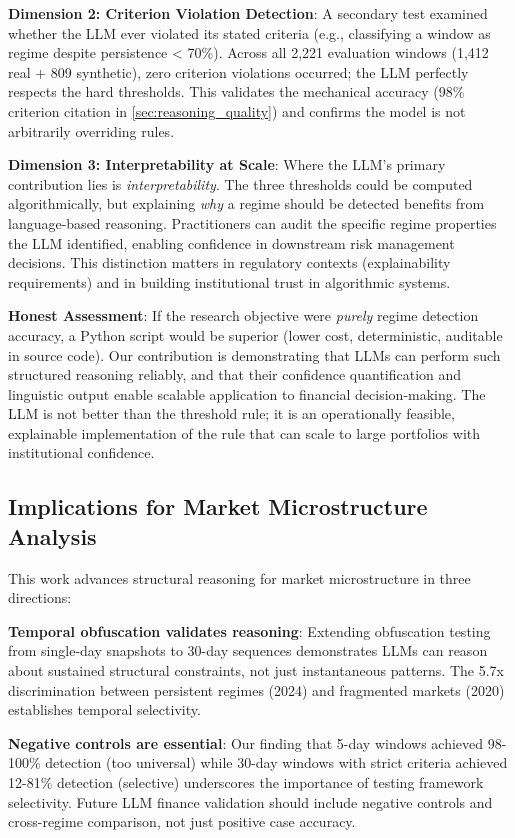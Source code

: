 \textbf{Dimension 2: Criterion Violation Detection}: A secondary test examined whether the LLM ever violated its stated criteria (e.g., classifying a window as regime despite persistence < 70\%). Across all 2,221 evaluation windows (1,412 real + 809 synthetic), zero criterion violations occurred; the LLM perfectly respects the hard thresholds. This validates the mechanical accuracy (98\% criterion citation in \ref{sec:reasoning_quality}) and confirms the model is not arbitrarily overriding rules.

\textbf{Dimension 3: Interpretability at Scale}: Where the LLM's primary contribution lies is \textit{interpretability}. The three thresholds could be computed algorithmically, but explaining \textit{why} a regime should be detected benefits from language-based reasoning. Practitioners can audit the specific regime properties the LLM identified, enabling confidence in downstream risk management decisions. This distinction matters in regulatory contexts (explainability requirements) and in building institutional trust in algorithmic systems.

\textbf{Honest Assessment}: If the research objective were \textit{purely} regime detection accuracy, a Python script would be superior (lower cost, deterministic, auditable in source code). Our contribution is demonstrating that LLMs can perform such structured reasoning reliably, and that their confidence quantification and linguistic output enable scalable application to financial decision-making. The LLM is not better than the threshold rule; it is an operationally feasible, explainable implementation of the rule that can scale to large portfolios with institutional confidence.

\subsection{Implications for Market Microstructure Analysis}

This work advances structural reasoning for market microstructure in three directions:

\textbf{Temporal obfuscation validates reasoning}: Extending obfuscation testing from single-day snapshots to 30-day sequences demonstrates LLMs can reason about sustained structural constraints, not just instantaneous patterns. The 5.7x discrimination between persistent regimes (2024) and fragmented markets (2020) establishes temporal selectivity.

\textbf{Negative controls are essential}: Our finding that 5-day windows achieved 98-100\% detection (too universal) while 30-day windows with strict criteria achieved 12-81\% detection (selective) underscores the importance of testing framework selectivity. Future LLM finance validation should include negative controls and cross-regime comparison, not just positive case accuracy.

